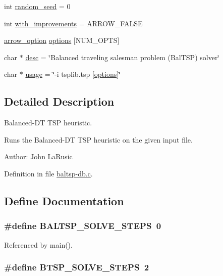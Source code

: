 \begin{CompactItemize}
\item 
int \hyperlink{bin_2baltsp-db_8c_d9059bc845096b2f05414a66c836b4ee}{random\_\-seed} = 0
\item 
int \hyperlink{bin_2baltsp-db_8c_91079460b00ac08193d5ee47094f8f70}{with\_\-improvements} = ARROW\_\-FALSE
\item 
\hyperlink{structarrow__option}{arrow\_\-option} \hyperlink{bin_2baltsp-db_8c_cea6a9709d519c143f30db401a0d0c72}{options} \mbox{[}NUM\_\-OPTS\mbox{]}
\item 
char $\ast$ \hyperlink{bin_2baltsp-db_8c_3aad16fd4bea1b9717f232ea75ad6449}{desc} = \char`\"{}Balanced traveling salesman problem (BalTSP) solver\char`\"{}
\item 
char $\ast$ \hyperlink{bin_2baltsp-db_8c_adebe2487a2c5240ab6cd02c83add0bf}{usage} = \char`\"{}-i tsplib.tsp \mbox{[}\hyperlink{tourinfo_8c_cea6a9709d519c143f30db401a0d0c72}{options}\mbox{]}\char`\"{}
\end{CompactItemize}


\subsection{Detailed Description}
Balanced-DT TSP heuristic. 

Runs the Balanced-DT TSP heuristic on the given input file.

\begin{Desc}
\item[Author:]John LaRusic \end{Desc}


Definition in file \hyperlink{bin_2baltsp-db_8c-source}{baltsp-db.c}.

\subsection{Define Documentation}
\hypertarget{bin_2baltsp-db_8c_d9b2b3cc92b48bea976b603f970e8e41}{
\subsubsection[{BALTSP\_\-SOLVE\_\-STEPS}]{\setlength{\rightskip}{0pt plus 5cm}\#define BALTSP\_\-SOLVE\_\-STEPS~0}}
\label{bin_2baltsp-db_8c_d9b2b3cc92b48bea976b603f970e8e41}




Referenced by main().\hypertarget{bin_2baltsp-db_8c_83255427b2f2f52d715e7b88d97ce089}{
\subsubsection[{BTSP\_\-SOLVE\_\-STEPS}]{\setlength{\rightskip}{0pt plus 5cm}\#define BTSP\_\-SOLVE\_\-STEPS~2}}
\label{bin_2baltsp-db_8c_83255427b2f2f52d715e7b88d97ce089}





